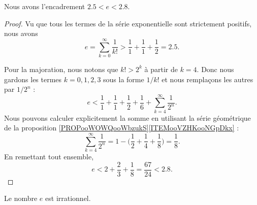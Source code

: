 \begin{lemma}		\label{LEMooXFAXooLVbebl}
	Nous avons l'encadrement \( 2.5<e<2.8\).
\end{lemma}

\begin{proof}
	Vu que tous les termes de la série exponentielle sont strictement positifs, nous avons
	\begin{equation}
		e=\sum_{k=0}^{\infty}\frac{1}{ k!}>\frac{1}{ 1}+\frac{1}{ 1}+\frac{1}{ 2}=2.5.
	\end{equation}

	Pour la majoration, nous notons que \( k!>2^k\) à partir de \( k=4\). Donc nous gardons les termes \( k=0,1,2,3\) sous la forme \( 1/k!\) et nous remplaçons les autres par \( 1/2^n\) :
	\begin{equation}
		e<\frac{1}{ 1}+\frac{1}{ 1}+\frac{1}{ 2}+\frac{1}{ 6}+\sum_{k=4}^{\infty}\frac{1}{ 2^n}.
	\end{equation}
	Nous pouvons calculer explicitement la somme en utilisant la série géométrique de la proposition \ref{PROPooWOWQooWbzukS}\ref{ITEMooVZHKooNGpDkx} :
	\begin{equation}
		\sum_{k=4}^{\infty}\frac{1}{ 2^n}=1-\big( \frac{1}{ 2}+\frac{1}{ 4}+\frac{1}{ 8} \big)=\frac{1}{ 8}.
	\end{equation}
	En remettant tout ensemble,
	\begin{equation}
		e<2+\frac{ 2 }{ 3 }+\frac{1}{ 8}=\frac{ 67 }{ 24 }<2.8.
	\end{equation}
\end{proof}

\begin{proposition}     \label{PROPooFRKUooZyhHIC}
	Le nombre \( e\) est irrationnel.
\end{proposition}


